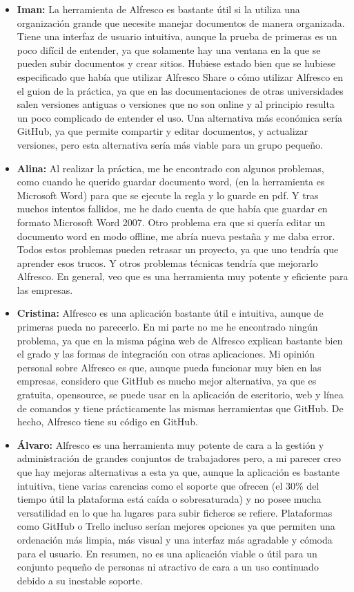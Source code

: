 \documentclass{article}
\begin{document}
\begin{itemize}
\item \textbf{Iman:} La herramienta de Alfresco es bastante útil si la utiliza una organización grande que necesite manejar documentos de manera organizada. Tiene una interfaz de usuario intuitiva, aunque la prueba de primeras es un poco difícil de entender, ya que solamente hay una ventana en la que se pueden subir documentos y crear sitios. Hubiese estado bien que se hubiese especificado que había que utilizar Alfresco Share o cómo utilizar Alfresco en el guion de la práctica, ya que en las documentaciones de otras universidades salen versiones antiguas o versiones que no son online y al principio resulta un poco complicado de entender el uso. Una alternativa más económica sería GitHub, ya que permite compartir y editar documentos, y actualizar versiones, pero esta alternativa sería más viable para un grupo pequeño.
\item \textbf{Alina:} Al realizar la práctica, me he encontrado con algunos problemas, como cuando he querido guardar documento word, (en la herramienta es Microsoft Word) para que se ejecute la regla y lo guarde en pdf. Y tras muchos intentos fallidos, me he dado cuenta de que había que guardar en formato Microsoft Word 2007. Otro problema era que si quería editar un documento word en modo offline, me abría nueva pestaña y me daba error. Todos estos problemas pueden retrasar un proyecto, ya que uno tendría que aprender esos trucos. Y otros problemas técnicas tendría que mejorarlo Alfresco. En general, veo que es una herramienta muy potente y eficiente para las empresas. 
\item \textbf{Cristina:} Alfresco es una aplicación bastante útil e intuitiva, aunque de primeras pueda no parecerlo. En mi parte no me he encontrado ningún problema, ya que en la misma página web de Alfresco explican bastante bien el grado y las formas de integración con otras aplicaciones. Mi opinión personal sobre Alfresco es que, aunque pueda funcionar muy bien en las empresas, considero que GitHub es mucho mejor alternativa, ya que es gratuita, opensource, se puede usar en la aplicación de escritorio, web y línea de comandos y tiene prácticamente las mismas herramientas que GitHub. De hecho, Alfresco tiene su código en GitHub.
\item \textbf{Álvaro:} Alfresco es una herramienta muy potente de cara a la gestión y administración de grandes conjuntos de trabajadores pero, a mi parecer creo que hay mejoras alternativas a esta ya que, aunque la aplicación es bastante intuitiva, tiene varias carencias como el soporte que ofrecen (el 30\% del tiempo útil la plataforma está caída o sobresaturada) y no posee mucha versatilidad en lo que ha lugares para subir ficheros se refiere. Plataformas como GitHub o Trello incluso serían mejores opciones ya que permiten una ordenación más limpia, más visual y una interfaz más agradable y cómoda para el usuario. En resumen, no es una aplicación viable o útil para un conjunto pequeño de personas ni atractivo de cara a un uso continuado debido a su inestable soporte.

\end{itemize}
\end{document}
